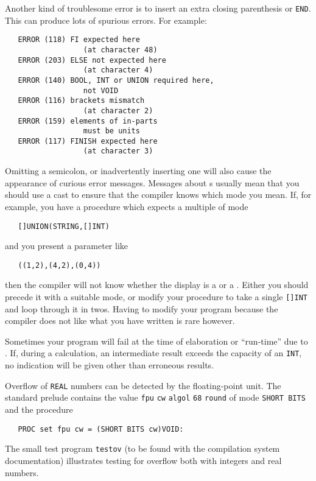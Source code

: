 Another kind of troublesome error is to insert an extra closing
parenthesis or \verb|END|. This can produce lots of spurious errors.
For example:
\begin{verbatim}
   ERROR (118) FI expected here
                  (at character 48)
   ERROR (203) ELSE not expected here
                  (at character 4)
   ERROR (140) BOOL, INT or UNION required here,
                  not VOID
   ERROR (116) brackets mismatch
                  (at character 2)
   ERROR (159) elements of in-parts
                  must be units
   ERROR (117) FINISH expected here
                  (at character 3)
\end{verbatim}
\noindent
Omitting a semicolon, or inadvertently inserting one will also cause
the appearance of curious error messages. Messages about
s usually mean that you should use a
cast to ensure that the compiler knows which mode you mean. If, for
example, you have a procedure which expects a multiple of mode
\begin{verbatim}
   []UNION(STRING,[]INT)
\end{verbatim}
\noindent
and you present a parameter like
\begin{verbatim}
   ((1,2),(4,2),(0,4))
\end{verbatim}
\noindent
then the compiler will not know whether the display is a
 or a
.  Either you should precede
it with a suitable mode, or modify your procedure to take a single
\verb|[]INT| and loop through it in twos.  Having to modify your
program because the compiler does not like what you have written is
rare however.

\pagebreak
{}
Sometimes your program will fail at the time of elaboration or
``run-time'' due to . If,
during a calculation, an intermediate result exceeds the capacity of an
\verb|INT|, no indication will be given other than erroneous results.

Overflow of \verb|REAL| numbers can be detected by the floating-point
unit. The standard prelude contains the value \verb|fpu| \verb|cw|
\verb|algol| \verb|68| \verb|round| of mode \verb|SHORT BITS| and the
procedure
\begin{verbatim}
   PROC set fpu cw = (SHORT BITS cw)VOID:
\end{verbatim}
\noindent
The small test program \verb|testov| (to be found with the
 compilation system documentation)
illustrates testing for overflow both with integers and real numbers.

